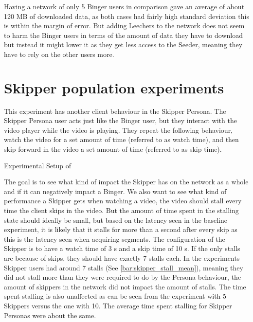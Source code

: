 \if{}

\fi

Having a network of only 5 Binger users in comparison gave an average of about 120 \ac{MB} of downloaded data, as both cases had fairly high standard deviation this is within the margin of error. But adding Leechers to the network does not seem to harm the Binger users in terms of the amount of data they have to download but instead it might lower it as they get less access to the Seeder, meaning they have to rely on the other users more.

\FloatBarrier \section{Skipper population experiments}
\label{sec:eval_skipper}
This experiment has another client behaviour in the Skipper Persona.
The Skipper Persona user acts just like the Binger user, but they interact with the video player while the video is playing. They repeat the following behaviour, watch the video for a set amount of time (referred to as watch time), and then skip forward in the video a set amount of time (referred to as skip time).

\begin{table}[!htbp]
\myfloatalign
\caption[Experimental Setup of Skipper]{Experimental Setup of }
\label{tab:exp_overview_skipper}

\end{table}


The goal is to see what kind of impact the Skipper has on the network as a whole and if it can negatively impact a Binger. We also want to see what kind of performance a Skipper gets when watching a video, the video should stall every time the client skips in the video. But the amount of time spent in the stalling state should ideally be small, but based on the latency seen in the baseline experiment, it is likely that it stalls for more than a second after every skip as this is the latency seen when acquiring segments. The configuration of the Skipper is to have a watch time of 3 \ac{s} and a skip time of 10 \ac{s}. If the only stalls are because of skips, they should have exactly 7 stalls each.
In the experiments Skipper users had around 7 stalls (See \autoref{bar:skipper_stall_mean}), meaning they did not stall more than they were required to do by the Persona behaviour, the amount of skippers in the network did not impact the amount of stalls. The time spent stalling is also unaffected as can be seen from the experiment with 5 Skippers versus the one with 10. The average time spent stalling for Skipper Personas were about the same.

